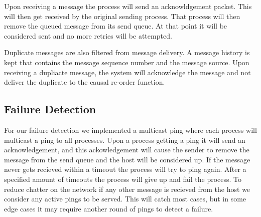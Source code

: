 \documentclass{article}
\begin{document}
Upon receiving a message the process will send an acknowldgement packet.  This will then get received by the original sending process.  That process will then remove the queued message from its send queue.  At that point it will be considered sent and no more retries will be attempted.

Duplicate messages are also filtered from message delivery.  A message history is kept that contains the message sequence number and the message source.  Upon receiving a dupliacte message, the system will acknowledge the message and not deliver the duplicate to the causal re-order function.

\subsection{Failure Detection}
For our failure detection we implemented a multicast ping where each process will multicast a ping to all processes.  Upon a process getting a ping it will send an acknowledgement, and this ackowledgement will cause the sender to remove the message from the send queue and the host will be considered up.  If the message never gets recieved within a timeout the process will try to ping again.  After a specified amount of timeouts the process will give up and fail the process.  To reduce chatter on the network if any other message is recieved from the host we consider any active pings to be served.  This will catch most cases, but in some edge cases it may require another round of pings to detect a failure.
\end{document}
